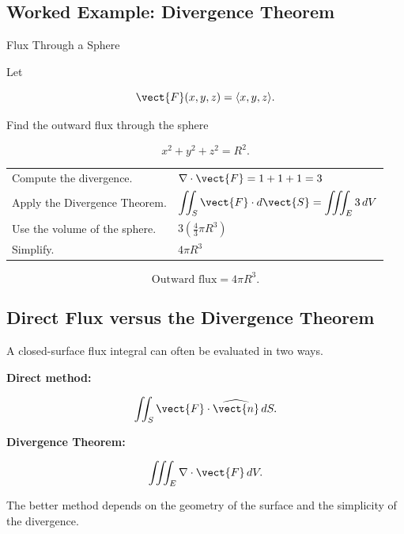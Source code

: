 \subsection{Worked Example: Divergence Theorem}
\label{subsec:worked-divergence-theorem}

\begin{workedexamplebox}{Flux Through a Sphere}

Let

\[ \vect{F}(x,y,z)=\langle x,y,z\rangle. \]

Find the outward flux through the sphere

\[ x^2+y^2+z^2=R^2. \]

\begin{tabularx}{\textwidth}{@{}>{\raggedright\arraybackslash}p{}X@{}}
Compute the divergence. &
\(\nabla\cdot\vect{F}=1+1+1=3\)\\
Apply the Divergence Theorem. &
\(\displaystyle \iint_S\vect{F}\cdot d\vect{S}
=\iiint_E3\,dV\)\\
Use the volume of the sphere. &
\(\displaystyle 3\left(\frac43\pi R^3\right)\)\\
Simplify. &
\(4\pi R^3\)
\end{tabularx}

\begin{answerbox}
\[ \boxed{\text{Outward flux}=4\pi R^3.} \]
\end{answerbox}
\end{workedexamplebox}

\subsection{Direct Flux versus the Divergence Theorem}
\label{subsec:direct-flux-vs-divergence}

A closed-surface flux integral can often be evaluated in two ways.

\textbf{Direct method:}

\[ \iint_S\vect{F}\cdot\widehat{\vect{n}}\,dS. \]

\textbf{Divergence Theorem:}

\[ \iiint_E\nabla\cdot\vect{F}\,dV. \]

The better method depends on the geometry of the surface and the simplicity
of the divergence.

